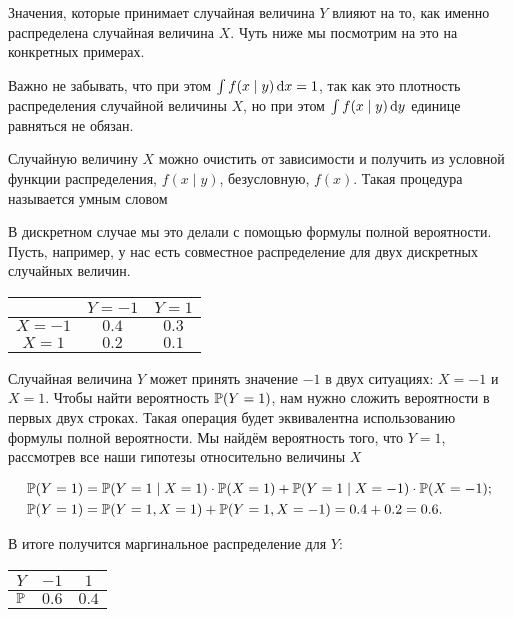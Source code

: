 Значения, которые принимает случайная величина $Y$ влияют на то, как именно распределена случайная величина $X$. Чуть ниже мы посмотрим на это на конкретных примерах. 

Важно не забывать, что при этом $\int f(x \mid y) \,\mathrm{d}x = 1$, так как это плотность распределения случайной величины $X$, но при этом $\int f(x \mid y) \,\mathrm{d}y$ единице равняться не обязан.

Случайную величину $X$ можно очистить от зависимости  и получить из условной функции распределения, $f(x \mid y)$, безусловную, $f(x)$.  Такая процедура называется умным словом 

В дискретном случае мы это делали с помощью формулы полной вероятности. Пусть, например, у нас есть совместное распределение для двух дискретных случайных величин.

\begin{center}
\begin{tabular}{c|c|c}
       &  $Y = -1$    &  $Y = 1$   \\ \hline
$X = -1$   & $0.4$    &  $0.3$ \\ \hline
$X = 1$    & $0.2$    &  $0.1$ \\
\end{tabular}
\end{center}

Случайная величина $Y$ может принять значение $-1$ в двух ситуациях: $X=-1$ и $X=1$. Чтобы найти вероятность $\mathbb{P}(Y=1)$, нам нужно сложить вероятности в первых двух строках. Такая операция будет эквивалентна использованию формулы полной вероятности. Мы найдём вероятность того, что $Y=1$, рассмотрев все наши гипотезы относительно величины $X$


\begin{equation*}
\begin{aligned}
 \mathbb{P}(Y=1) &= \mathbb{P}(Y=1 \mid X=1) \cdot \mathbb{P}(X=1) + \mathbb{P}(Y=1 \mid X = -1) \cdot \mathbb{P}(X = -1);\\
  \mathbb{P}(Y=1) &=   \mathbb{P}(Y=1, X=1) + \mathbb{P}(Y=1,X=-1) = 0.4 + 0.2 = 0.6.
  \end{aligned}
 \end{equation*}

 В итоге получится маргинальное распределение для $Y$: 

\begin{center}
\begin{tabular}{c|c|c}
$Y $ &  $-1$    &  $1$     \\ \hline
$\mathbb{P}$&  	$0.6$   &  $0.4$   \\
\end{tabular}
\end{center}

